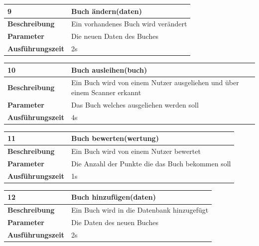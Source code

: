 \documentclass[fontsize=12pt,paper=a4,twoside]{scrartcl}
\begin{document}
\begin{table}
	[H] \label{a9} 
	\begin{tabular}
		{|l|p{10cm}|} \hline \textbf{9} & \textbf{Buch ändern(daten)} \\
		\hline \textbf{Beschreibung} & Ein vorhandenes Buch wird verändert \\
		\hline \textbf{Parameter} & Die neuen Daten des Buches \\
		\hline \textbf{Ausführungszeit} & 2s\\
		\hline 
	\end{tabular}
\end{table}
\begin{table}
	[H] \label{a10} 
	\begin{tabular}
		{|l|p{10cm}|} \hline \textbf{10} & \textbf{ Buch ausleihen(buch)} \\
		\hline \textbf{Beschreibung} & Ein Buch wird von einem Nutzer ausgeliehen und über einem Scanner erkannt \\
		\hline \textbf{Parameter} & Das Buch welches ausgeliehen werden soll \\
		\hline \textbf{Ausführungszeit} & 4s\\
		\hline 
	\end{tabular}
\end{table}
\begin{table}
	[H] \label{a11} 
	\begin{tabular}
		{|l|p{10cm}|} \hline \textbf{11} & \textbf{Buch bewerten(wertung)} \\
		\hline \textbf{Beschreibung} & Ein Buch wird von einem Nutzer bewertet\\
		\hline \textbf{Parameter} & Die Anzahl der Punkte die das Buch bekommen soll \\
		\hline \textbf{Ausführungszeit} & 1s\\
		\hline 
	\end{tabular}
\end{table}
\begin{table}
	[H] \label{a12} 
	\begin{tabular}
		{|l|p{10cm}|} \hline \textbf{12} & \textbf{Buch hinzufügen(daten)} \\
		\hline \textbf{Beschreibung} & Ein Buch wird in die Datenbank hinzugefügt\\
		\hline \textbf{Parameter} & Die Daten des neuen Buches \\
		\hline \textbf{Ausführungszeit} & 2s\\
		\hline 
	\end{tabular}
\end{table}
\end{document}
